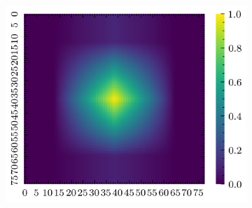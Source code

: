 \begin{figure}[H]
\begin{subfigure}[b]{0.19\textwidth}
        \includegraphics[width=\linewidth]{../img/5/quarry/false_negative/grad-cam-2d-4.png}
    \end{subfigure}  


\end{figure}
